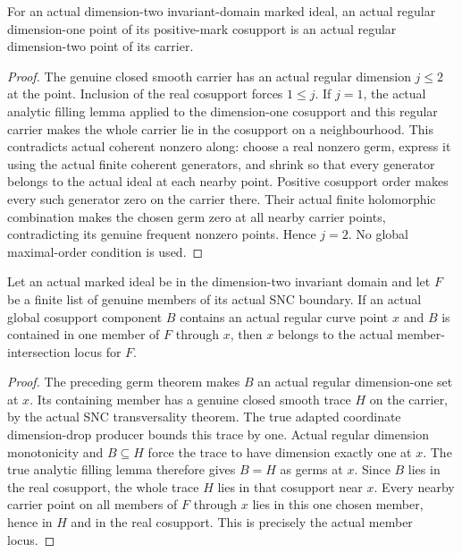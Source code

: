 \begin{lemma}
\label{hir:general-two-curve-carrier-surface}
\leanok
For an actual dimension-two invariant-domain marked ideal, an actual
regular dimension-one point of its positive-mark cosupport is an actual
regular dimension-two point of its carrier.
\end{lemma}
\begin{proof}
The genuine closed smooth carrier has an actual regular dimension $j\le2$
at the point. Inclusion of the real cosupport forces $1\le j$. If $j=1$,
the actual analytic filling lemma applied to the dimension-one cosupport
and this regular carrier makes the whole carrier lie in the cosupport on
a neighbourhood. This contradicts actual coherent nonzero along: choose
a real nonzero germ, express it using the actual finite coherent generators,
and shrink so that every generator belongs to the actual ideal at each
nearby point. Positive cosupport order makes every such generator zero
on the carrier there. Their actual finite holomorphic combination makes
the chosen germ zero at all nearby carrier points, contradicting its
genuine frequent nonzero points. Hence $j=2$. No global maximal-order
condition is used.
\end{proof}

\begin{lemma}
\label{hir:general-two-curve-boundary-special}
\leanok
Let an actual marked ideal be in the dimension-two invariant domain and
let $F$ be a finite list of genuine members of its actual SNC boundary.
If an actual global cosupport component $B$ contains an actual regular
curve point $x$ and $B$ is contained in one member of $F$ through $x$,
then $x$ belongs to the actual member-intersection locus for $F$.
\end{lemma}
\begin{proof}
The preceding germ theorem makes $B$ an actual regular dimension-one set
at $x$. Its containing member has a genuine closed smooth trace $H$ on
the carrier, by the actual SNC transversality theorem. The true adapted
coordinate dimension-drop producer bounds this trace by one. Actual
regular dimension monotonicity and $B\subseteq H$ force the trace to have
dimension exactly one at $x$. The true analytic filling lemma therefore
gives $B=H$ as germs at $x$. Since $B$ lies in the real cosupport, the whole
trace $H$ lies in that cosupport near $x$. Every nearby carrier point on
all members of $F$ through $x$ lies in this one chosen member, hence in
$H$ and in the real cosupport. This is precisely the actual member locus.
\end{proof}

